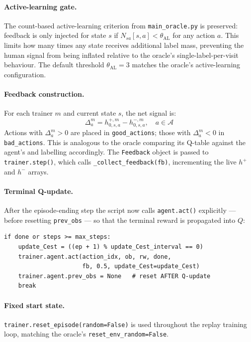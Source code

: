 \documentclass[11pt, a4paper]{article}
\begin{document}
\paragraph{Active-learning gate.}
The count-based active-learning criterion from \texttt{main\_oracle.py} is
preserved: feedback is only injected for state $s$ if
$N_{sa}[s, a] < \theta_{\text{AL}}$ for any action $a$.  This limits how many
times any state receives additional label mass, preventing the human signal
from being inflated relative to the oracle's single-label-per-visit
behaviour.  The default threshold $\theta_{\text{AL}} = 3$ matches the
oracle's active-learning configuration.

\paragraph{Feedback construction.}
For each trainer $m$ and current state $s$, the net signal is:
\begin{equation}
  \Delta^m_a = h^{+,m}_{0,s,a} - h^{-,m}_{0,s,a}, \quad a \in \mathcal{A}
\end{equation}
Actions with $\Delta^m_a > 0$ are placed in \texttt{good\_actions}; those
with $\Delta^m_a < 0$ in \texttt{bad\_actions}.  This is analogous to the
oracle comparing its Q-table against the agent's and labelling accordingly.
The \texttt{Feedback} object is passed to \texttt{trainer.step()}, which
calls \texttt{\_collect\_feedback(fb)}, incrementing the live $h^+$ and
$h^-$ arrays.

\paragraph{Terminal Q-update.}
After the episode-ending step the script now calls \texttt{agent.act()}
explicitly — before resetting \texttt{prev\_obs} — so that the terminal
reward is propagated into $Q$:

\begin{lstlisting}
if done or steps >= max_steps:
    update_Cest = ((ep + 1) % update_Cest_interval == 0)
    trainer.agent.act(action_idx, ob, rw, done,
                      fb, 0.5, update_Cest=update_Cest)
    trainer.agent.prev_obs = None   # reset AFTER Q-update
    break
\end{lstlisting}

\paragraph{Fixed start state.}
\texttt{trainer.reset\_episode(random=False)} is used throughout the replay
training loop, matching the oracle's \texttt{reset\_env\_random=False}.
\end{document}
